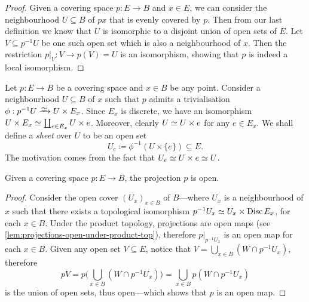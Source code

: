 \begin{proof}
    Given a covering space \(p: E \to B\) and \(x \in E\), we can consider the
    neighbourhood \(U \subseteq B\) of \(p x\) that is evenly covered by \(p\). Then
    from our last definition we know that \(U\) is isomorphic to a disjoint union of
    open sets of \(E\). Let \(V \subseteq p^{-1} U\) be one such open set which is
    also a neighbourhood of \(x\). Then the restriction \(p|_V: V \to p(V) = U\) is
    an isomorphism, showing that \(p\) is indeed a local isomorphism.
\end{proof}

\begin{notation}[Sheets]
    \label{not:coveing-space-sheet}
    Let \(p: E \to B\) be a covering space and \(x \in B\) be any point. Consider a
    neighbourhood \(U \subseteq B\) of \(x\) such that \(p\) admits a trivialisation
    \(\phi: p^{-1} U \isoto U \times E_x\). Since \(E_x\) is discrete, we have an
    isomorphism \(U \times E_x \simeq \coprod_{e \in E_x} U \times e\). Moreover,
    clearly \(U \simeq U \times e\) for any \(e \in E_x\). We shall define a
    \emph{sheet} over \(U\) to be an open set
    \begin{equation}\label{eq:covering-space-sheet}
        U_e \coloneq \phi^{-1}(U \times \{e\}) \subseteq E.
    \end{equation}
    The motivation comes from the fact that \(U_e \simeq U \times e \simeq U\).
\end{notation}

\begin{proposition}
    \label{prop:covering-projection-is-open}
    Given a covering space \(p: E \to B\), the projection \(p\) is open.
\end{proposition}

\begin{proof}
    Consider the open cover \((U_x)_{x \in B}\) of \(B\)---where \(U_x\) is a
    neighbourhood of \(x\) such that there exists a topological isomorphism
    \(p^{-1} U_x \simeq U_x \times \operatorname{Disc} E_x\), for each \(x \in B\). Under the
    product topology, projections are open maps (see
    \cref{lem:projections-open-under-product-top}), therefore \(p|_{p^{-1} U_x}\) is
    an open map for each \(x \in B\). Given any open set \(V \subseteq E\), notice
    that \(V = \bigcup_{x \in B} (W \cap p^{-1} U_x)\), therefore
    \[
        p V = p\Big(\bigcup_{x \in B} (W \cap p^{-1} U_x)\Big)
        = \bigcup_{x \in B} p(W \cap p^{-1} U_x)
    \]
    is the union of open sets, thus open---which shows that \(p\) is an open map.
\end{proof}

